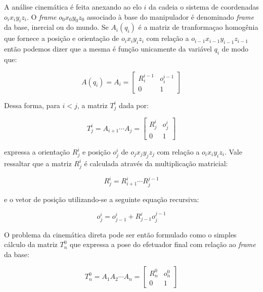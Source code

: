 A análise cinemática é feita anexando ao elo $i$ da cadeia o sistema de coordenadas $o_ix_iy_iz_i$. O \emph{frame} $o_0x_0y_0z_0$ associado à base do manipulador é denominado \emph{frame} da base, inercial ou do mundo. Se $A_i(q_i)$ é a matriz de tranformaçao homogênia que fornece a posição e orientação de $o_ix_iy_iz_i$ com relação a $o_{i-1}x_{i-1}y_{i-1}z_{i-1}$ então podemos dizer que a mesma é função unicamente da variável $q_i$ de modo que:

\begin{equation}
    A(q_i) = A_i = \begin{bmatrix}
        R^{i-1}_i & o^{i-1}_i \\
        0 & 1
    \end{bmatrix}
\end{equation}

Dessa forma, para  $i < j$, a matriz $T_j^i$ dada por:

\begin{equation}
    T_j^i = A_{i+1} \cdots A_j = \begin{bmatrix}
        R^i_j & o^i_j \\
        0 & 1
    \end{bmatrix}
\end{equation}

expressa a orientação $R^i_j$ e posição $o^i_j$ de $o_jx_jy_jz_j$ com relação a $o_ix_iy_iz_i$. Vale ressaltar que a matriz $R^i_j$ é calculada através da multiplicação matricial:

\begin{equation}
    R^i_j = R^i_{i+1} \cdots R^{j-1}_j
\end{equation}

e o vetor de posição utilizando-se a seguinte equação recursiva:

\begin{equation}
    o^i_j = o^i_{j-1} + R^i_{j-1}o^{j-1}_j
\end{equation}

O problema da cinemática direta pode ser então formulado como o simples cálculo da matriz $T^0_n$ que expressa a pose do efetuador final com relação ao \emph{frame} da base:

\begin{equation}\label{eq:fkine}
    T^0_n = A_1 A_2 \cdots A_n = \begin{bmatrix}
        R^0_n & o^0_n \\
        0 & 1
    \end{bmatrix}
\end{equation}

